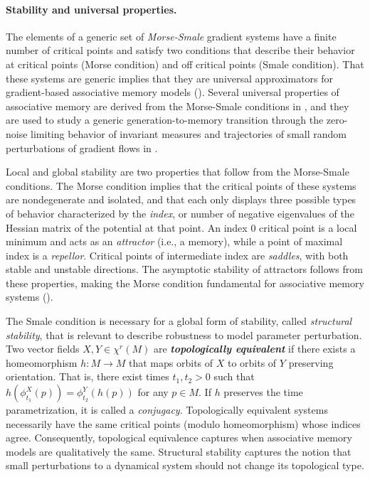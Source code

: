 \documentclass[12pt]{article}
\begin{document}
\paragraph{Stability and universal properties.}
The elements of a generic set of \textit{Morse-Smale} gradient systems have a finite number of critical points and satisfy two conditions that describe their behavior at critical points (Morse condition) and off critical points (Smale condition). That these systems are generic implies that they are universal approximators for gradient-based associative memory models (). Several universal properties of associative memory are derived from the Morse-Smale conditions in , and they are used to study a generic generation-to-memory transition through the zero-noise limiting behavior of invariant measures and trajectories of small random perturbations of gradient flows in .

Local and global stability are two properties that follow from the Morse-Smale conditions. The Morse condition implies that the critical points of these systems are nondegenerate and isolated, and that each only displays three possible types of behavior characterized by the \textit{index}, or number of negative eigenvalues of the Hessian matrix of the potential at that point. An index $0$ critical point is a local minimum and acts as an \textit{attractor} (i.e., a memory), while a point of maximal index is a \textit{repellor}. Critical points of intermediate index are \textit{saddles}, with both stable and unstable directions. The asymptotic stability of attractors follows from these properties, making the Morse condition fundamental for associative memory systems ().

The Smale condition is necessary for a global form of stability, called \textit{structural stability}, that is relevant to describe robustness to model parameter perturbation. Two vector fields $X,Y \in \chi^r(M)$ are \textit{\textbf{topologically equivalent}} if there exists a homeomorphism $h: M \rightarrow M$ that maps orbits of $X$ to orbits of $Y$ preserving orientation. That is, there exist times $t_1, t_2 >0$ such that $h(\phi^X_{t_{1}}(p)) = \phi^Y_{t_{2}}\left( h(p)\right)$ for any $p\in M$. If $h$ preserves the time parametrization, it is called a \textit{conjugacy}. Topologically equivalent systems necessarily have the same critical points (modulo homeomorphism) whose indices agree. Consequently, topological equivalence captures when associative memory models are qualitatively the same. Structural stability captures the notion that small perturbations to a dynamical system should not change its topological type. 
\end{document}
